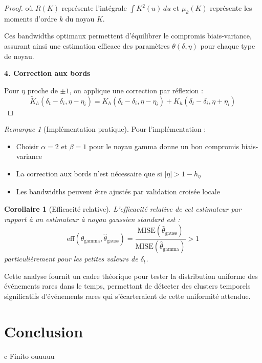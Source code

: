 \documentclass[12pt,a4paper]{article}
\newtheorem{corollary}[theorem]{Corollaire}
\theoremstyle{definition}
\theoremstyle{remark}
\newtheorem{remark}[theorem]{Remarque}
\begin{document}
\begin{proof}
    où \(R(K)\) représente l'intégrale \( \int K^2(u) \, du \) et \(\mu_k(K)\) représente les moments d'ordre \(k\) du noyau \(K\).

    Ces bandwidths optimaux permettent d'équilibrer le compromis biais-variance, assurant ainsi une estimation efficace des paramètres \(\theta(\delta, \eta)\) pour chaque type de noyau.
    
    \textbf{4. Correction aux bords}
    
    Pour $\eta$ proche de $\pm 1$, on applique une correction par réflexion :
    \[
    \tilde{K}_h(\delta_t - \delta_i, \eta - \eta_i) = K_h(\delta_t - \delta_i, \eta - \eta_i) + K_h(\delta_t - \delta_i, \eta + \eta_i)
    \]
    \end{proof}
    
    \begin{remark}[Implémentation pratique]
    Pour l'implémentation :
    \begin{itemize}
        \item Choisir $\alpha = 2$ et $\beta = 1$ pour le noyau gamma donne un bon compromis biais-variance
        \item La correction aux bords n'est nécessaire que si $|\eta| > 1-h_\eta$
        \item Les bandwidths peuvent être ajustés par validation croisée locale
    \end{itemize}
    \end{remark}
    
    \begin{corollary}[Efficacité relative]
    L'efficacité relative de cet estimateur par rapport à un estimateur à noyau gaussien standard est :
    \[
    \text{eff}(\hat{\theta}_{\text{gamma}}, \hat{\theta}_{\text{gauss}}) = \frac{\text{MISE}(\hat{\theta}_{\text{gauss}})}{\text{MISE}(\hat{\theta}_{\text{gamma}})} > 1
    \]
    particulièrement pour les petites valeurs de $\delta_t$.
    \end{corollary}
    


    Cette analyse fournit un cadre théorique pour tester la distribution uniforme des événements rares dans le temps, permettant de détecter des clusters temporels significatifs d'événements rares qui s'écarteraient de cette uniformité attendue.


    \newpage
    \vspace*{5cm}
    \section*{Conclusion}
    \vspace*{2cm}
    c Finito ouuuuu
    \newpage
    \vspace*{5cm}
\end{document}
